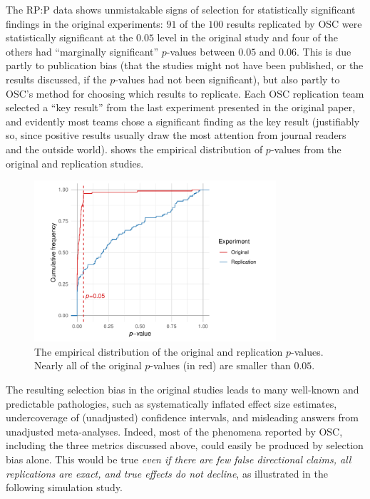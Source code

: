 \documentclass[aoas, preprint]{imsart}
\theoremstyle{definition}
\theoremstyle{custom}
\begin{document}
  The RP:P data shows unmistakable signs of selection for statistically significant findings in the original experiments: $91$ of the $100$ results replicated by OSC were statistically significant at the $0.05$ level in the original study and four of the others had ``marginally significant'' $p$-values between $0.05$ and $0.06$. This is due partly to publication bias (that the studies might not have been published, or the results discussed, if the $p$-values had not been significant), but also partly to OSC's method for choosing which results to replicate. Each OSC replication team selected a ``key result'' from the last experiment presented in the original paper, and evidently most teams chose a significant finding as the key result (justifiably so, since positive results usually draw the most attention from journal readers and the outside world).  shows the empirical distribution of $p$-values from the original and replication studies.
  \begin{figure}[htbp]
    \centering
    \includegraphics[width=0.8\textwidth]{ecdf}
    \caption{The empirical distribution of the original and replication $p$-values. Nearly all of the original $p$-values (in red) are smaller than $0.05$.}
  \label{fig:pval-dist}
  \end{figure}

  The resulting selection bias in the original studies leads to many well-known and predictable pathologies, such as systematically inflated effect size estimates, undercoverage of (unadjusted) confidence intervals, and misleading answers from unadjusted meta-analyses. Indeed, most of the phenomena reported by OSC, including the three metrics discussed above, could easily be produced by selection bias alone. This would be true {\em even if there are few false directional claims, all replications are exact, and true effects do not decline}, as illustrated in the following simulation study.
  
\end{document}

